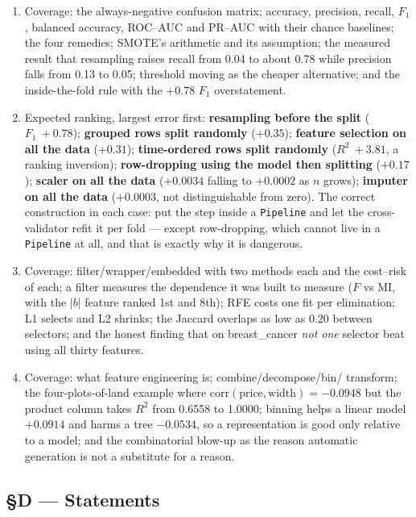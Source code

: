 \documentclass[11pt,a4paper]{article}
\newcommand{\A}[1]{\item[\textbf{#1}]}
\begin{document}
\begin{enumerate}[leftmargin=1.9cm]
\A{U4.83} Coverage: the always-negative confusion matrix; accuracy, precision,
recall, $F_1$, balanced accuracy, ROC--AUC and PR--AUC with their chance
baselines; the four remedies; SMOTE's arithmetic and its assumption; the
measured result that resampling raises recall from 0.04 to about 0.78 while
precision falls from 0.13 to 0.05; threshold moving as the cheaper alternative;
and the inside-the-fold rule with the $+0.78$ $F_1$ overstatement.

\A{U4.84} Expected ranking, largest error first: \textbf{resampling before the
split} ($F_1\ +0.78$); \textbf{grouped rows split randomly} ($+0.35$);
\textbf{feature selection on all the data} ($+0.31$); \textbf{time-ordered rows
split randomly} ($R^2\ +3.81$, a ranking inversion); \textbf{row-dropping using
the model then splitting} ($+0.17$); \textbf{scaler on all the data}
($+0.0034$ falling to $+0.0002$ as $n$ grows); \textbf{imputer on all the data}
($+0.0003$, not distinguishable from zero). The correct construction in each
case: put the step inside a \texttt{Pipeline} and let the cross-validator refit
it per fold --- except row-dropping, which cannot live in a
\texttt{Pipeline} at all, and that is exactly why it is dangerous.

\A{U4.85} Coverage: filter/wrapper/embedded with two methods each and the
cost--risk of each; a filter measures the dependence it was built to measure
($F$ vs MI, with the $|b|$ feature ranked 1st and 8th); RFE costs one fit per
elimination; L1 selects and L2 shrinks; the Jaccard overlaps as low as 0.20
between selectors; and the honest finding that on breast\_cancer \emph{not one}
selector beat using all thirty features.

\A{U4.86} Coverage: what feature engineering is; combine/decompose/bin/
transform; the four-plots-of-land example where $\text{corr}(\text{price},
\text{width}) = -0.0948$ but the product column takes $R^2$ from 0.6558 to
1.0000; binning helps a linear model $+0.0914$ and harms a tree $-0.0534$, so a
representation is good only relative to a model; and the combinatorial
blow-up as the reason automatic generation is not a substitute for a reason.
\end{enumerate}

\subsection*{§D --- Statements}
\end{document}

